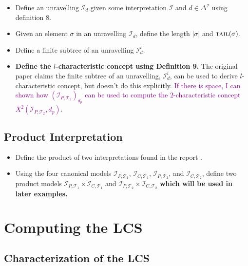 \documentclass[a4paper,USenglish,cleveref,autoref,thm-restate]{lipics-v2021}
\newcommand{\interpretation}{\mathcal{I}}
\newcommand{\I}{\mathcal{I}}
\newcommand{\TBox}{\mathcal{T}}
\newcommand{\interdomain}{\Delta^{\interpretation{}}}
\newcommand{\canonical}[2]{\interpretation_{#1, #2}}
\newcommand{\len}[1]{\lvert #1 \rvert}
\newcommand{\tail}[1]{\textsc{tail}(#1)}
\begin{document}
    \begin{itemize}
        \item Define an unravelling $\I_d$ given some interpretation $\I$ and $d \in \interdomain$ using definition 8. 
        \item Given an element $\sigma$ in an unravelling $\I_d$, define the length $\len{\sigma}$ and $\tail{\sigma}$. 
        \item Define a finite subtree of an unravelling $\I_d^l$. 
        \item \textbf{Define the $l$-characteristic concept using Definition 9.} The original paper claims the 
        finite subtree of an unravelling, $\I_d^l$, can be used to derive $l$-characteristic concept, 
        but doesn't do this explicitly. \textcolor{purple}{If there is space, I can shown how $(\canonical{P}{\TBox_2})_{d_p}$ 
        can be used to compute the $2$-characteristic concept $X^2(\canonical{P}{\TBox_2}, d_p)$}.
    \end{itemize}

\subsection{Product Interpretation}
    
    \begin{itemize}
        \item Define the product of two interpretations found in the report \cite{technology2013most}.
        \item Using the four canonical models $\canonical{P}{\TBox_1}$, $\canonical{C}{\TBox_1}$, $\canonical{P}{\TBox_2}$, and 
        $\canonical{C}{\TBox_2}$, define two product models $\canonical{P}{\TBox_1} \times \canonical{C}{\TBox_1}$ and $\canonical{P}{\TBox_2} \times \canonical{C}{\TBox_2}$ \textbf{which will be used in later examples.} 
    \end{itemize}

\section{Computing the LCS}
  
\subsection{Characterization of the LCS}
\end{document}
